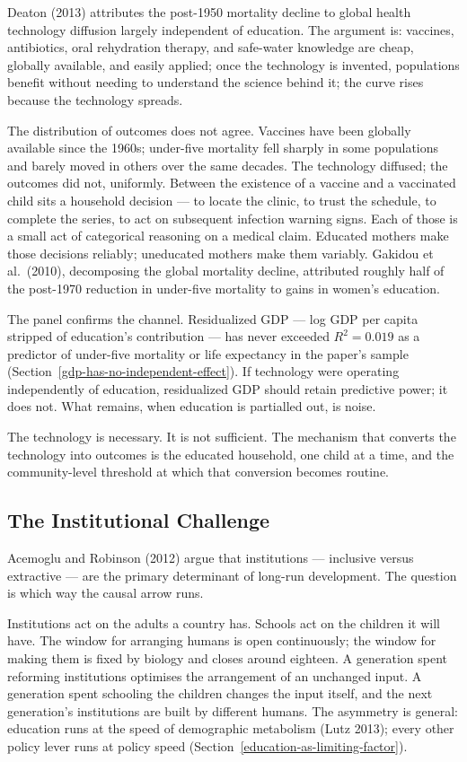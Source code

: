 \documentclass[12pt,letterpaper]{article}
\begin{document}
{Deaton (2013) attributes the post-1950 mortality decline to global health technology diffusion largely independent of education. The argument is: vaccines, antibiotics, oral rehydration therapy, and safe-water knowledge are cheap, globally available, and easily applied; once the technology is invented, populations benefit without needing to understand the science behind it; the curve rises because the technology spreads.

The distribution of outcomes does not agree. Vaccines have been globally available since the 1960s; under-five mortality fell sharply in some populations and barely moved in others over the same decades. The technology diffused; the outcomes did not, uniformly. Between the existence of a vaccine and a vaccinated child sits a household decision --- to locate the clinic, to trust the schedule, to complete the series, to act on subsequent infection warning signs. Each of those is a small act of categorical reasoning on a medical claim. Educated mothers make those decisions reliably; uneducated mothers make them variably. Gakidou et al.\ (2010), decomposing the global mortality decline, attributed roughly half of the post-1970 reduction in under-five mortality to gains in women's education.

The panel confirms the channel. Residualized GDP --- log GDP per capita stripped of education's contribution --- has never exceeded $R^2 = 0.019$ as a predictor of under-five mortality or life expectancy in the paper's sample (Section~\ref{gdp-has-no-independent-effect}). If technology were operating independently of education, residualized GDP should retain predictive power; it does not. What remains, when education is partialled out, is noise.

The technology is necessary. It is not sufficient. The mechanism that converts the technology into outcomes is the educated household, one child at a time, and the community-level threshold at which that conversion becomes routine.

\subsection{The Institutional Challenge}\label{the-institutional-challenge}

Acemoglu and Robinson (2012) argue that institutions --- inclusive versus extractive --- are the primary determinant of long-run development. The question is which way the causal arrow runs.

Institutions act on the adults a country has. Schools act on the children it will have. The window for arranging humans is open continuously; the window for making them is fixed by biology and closes around eighteen. A generation spent reforming institutions optimises the arrangement of an unchanged input. A generation spent schooling the children changes the input itself, and the next generation's institutions are built by different humans. The asymmetry is general: education runs at the speed of demographic metabolism (Lutz 2013); every other policy lever runs at policy speed (Section~\ref{education-as-limiting-factor}).

}
\end{document}
